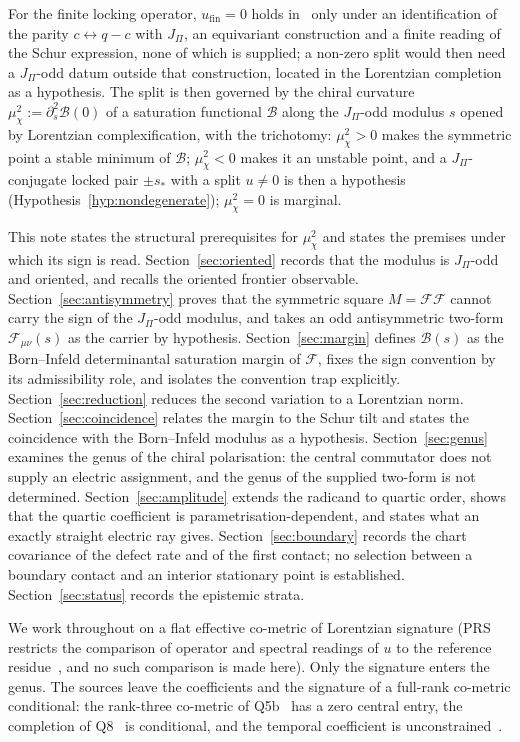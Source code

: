 \documentclass[11pt]{article}
\theoremstyle{definition}
\theoremstyle{remark}
\newcommand{\JPi}{J_{\Pi}}
\newcommand{\Fchi}{\mathcal{F}}
\newcommand{\Bsat}{\mathcal{B}}
\newcommand{\muchi}{\mu_{\chi}^{2}}
\begin{document}
    For the finite locking operator, $u_{\mathrm{fin}}=0$ holds in~\cite{Beau2026prs} only under an identification of
    the parity $c\leftrightarrow q-c$ with $\JPi$, an equivariant construction and a finite reading of the Schur
    expression, none of which is supplied; a non-zero split would then need a $\JPi$-odd datum outside that
    construction, located in the Lorentzian completion as a hypothesis.
    The split is then governed by the chiral curvature $\muchi := \partial_s^2 \Bsat(0)$ of a saturation functional $\Bsat$
    along the $\JPi$-odd modulus $s$ opened by Lorentzian complexification, with the trichotomy: $\muchi > 0$ makes the
    symmetric point a stable minimum of $\Bsat$; $\muchi < 0$ makes it an unstable point, and a $\JPi$-conjugate
    locked pair $\pm s_*$ with a split $u \neq 0$ is then a hypothesis (Hypothesis~\ref{hyp:nondegenerate});
    $\muchi = 0$ is marginal.

    This note states the structural prerequisites for $\muchi$ and states the premises under which its sign is read.
    Section~\ref{sec:oriented} records that the modulus is $\JPi$-odd and oriented, and recalls the oriented frontier
    observable.
    Section~\ref{sec:antisymmetry} proves that the symmetric square $M = \Fchi \Fchi$ cannot carry the sign of the
    $\JPi$-odd modulus, and takes an odd antisymmetric two-form $\Fchi_{\mu\nu}(s)$ as the carrier by hypothesis.
    Section~\ref{sec:margin} defines $\Bsat(s)$ as the Born--Infeld determinantal saturation margin of $\Fchi$, fixes the
    sign
    convention by its admissibility role, and isolates the convention trap explicitly.
    Section~\ref{sec:reduction} reduces the second variation to a Lorentzian norm.
    Section~\ref{sec:coincidence} relates the margin to the Schur tilt and states the coincidence with the
    Born--Infeld modulus as a hypothesis.
    Section~\ref{sec:genus} examines the genus of the chiral polarisation: the central commutator does not supply an
    electric assignment, and the genus of the supplied two-form is not determined.
    Section~\ref{sec:amplitude} extends the radicand to quartic order, shows that the quartic coefficient is
    parametrisation-dependent, and states what an exactly straight electric ray gives.
    Section~\ref{sec:boundary} records the chart covariance of the defect rate and of the first contact; no selection
    between a boundary contact and an interior stationary point is established.
    Section~\ref{sec:status} records the epistemic strata.

    We work throughout on a flat effective co-metric of Lorentzian signature (PRS restricts the comparison of operator
    and
    spectral readings of $u$ to the reference residue~\cite{Beau2026prs}, and no such comparison is made here).
    Only the signature enters the genus.
    The sources leave the coefficients and the signature of a full-rank co-metric conditional: the rank-three
    co-metric of Q5b~\cite{Beau2026q5b} has a zero central entry, the completion of Q8~\cite{BeauQ8} is conditional,
    and the temporal coefficient is unconstrained~\cite{Beau2026q11}.
\end{document}
